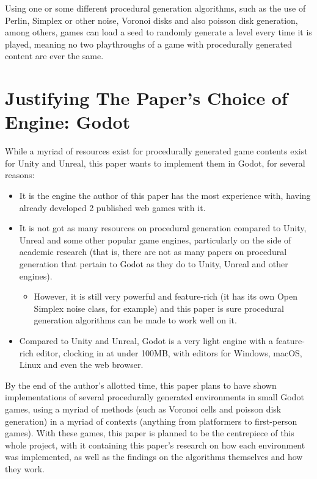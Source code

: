 Using one or some different procedural generation algorithms, such as the use of Perlin, Simplex or other noise, Voronoi disks and also poisson disk generation, among others, games can load a seed to randomly generate a level every time it is played, meaning no two playthroughs of a game with procedurally generated content are ever the same.

\section{Justifying The Paper's Choice of Engine: Godot}

While a myriad of resources exist for procedurally generated game contents exist for Unity and Unreal, this paper wants to implement them in Godot, for several reasons:

\begin{itemize}
	\item It is the engine the author of this paper has the most experience with, having already developed 2 published web games with it.
	\item It is not got as many resources on procedural generation compared to Unity, Unreal and some other popular game engines, particularly on the side of academic research (that is, there are not as many papers on procedural generation that pertain to Godot as they do to Unity, Unreal and other engines).
	\begin{itemize}
		\item However, it is still very powerful and feature-rich (it has its own Open Simplex noise class, for example) and this paper is sure procedural generation algorithms can be made to work well on it.
	\end{itemize}
	\item Compared to Unity and Unreal, Godot is a very light engine with a feature-rich editor, clocking in at under 100MB, with editors for Windows, macOS, Linux and even the web browser. 
\end{itemize}

By the end of the author's allotted time, this paper plans to have shown implementations of several procedurally generated environments in small Godot games, using a myriad of methods (such as Voronoi cells and poisson disk generation) in a myriad of contexts (anything from platformers to first-person games). With these games, this paper is planned to be the centrepiece of this whole project, with it containing this paper's research on how each environment was implemented, as well as the findings on the algorithms themselves and how they work.

